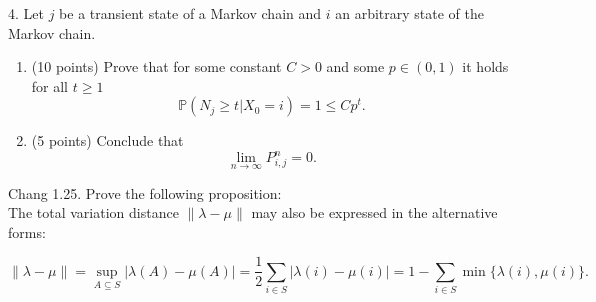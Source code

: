 \documentclass{article}
\begin{document}
4. Let $j$ be a transient state of a Markov chain and $i$ an arbitrary state of the Markov chain.
 
\begin{enumerate}[label=(\alph*)]
    \item (10 points) Prove that for some constant $C > 0$ and some $p \in (0,1)$ it holds for all $t \geq 1$
\[
\mathbb{P}(N_j \geq t | X_0 = i) = 1 \leq C p^t.
\]

\item (5 points) Conclude that 
\[
\lim_{n \to \infty} P^n_{i,j} = 0.
\]
\end{enumerate}

Chang 1.25. Prove the following proposition:  \\
The total variation distance $\|\lambda - \mu\|$ may also be expressed in the alternative forms:

\[
\|\lambda - \mu\| = \sup_{A \subseteq S} |\lambda(A) - \mu(A)| = \frac{1}{2} \sum_{i \in S} |\lambda(i) - \mu(i)| = 1 - \sum_{i \in S} \min\{\lambda(i), \mu(i)\}.
\]
\end{document}
